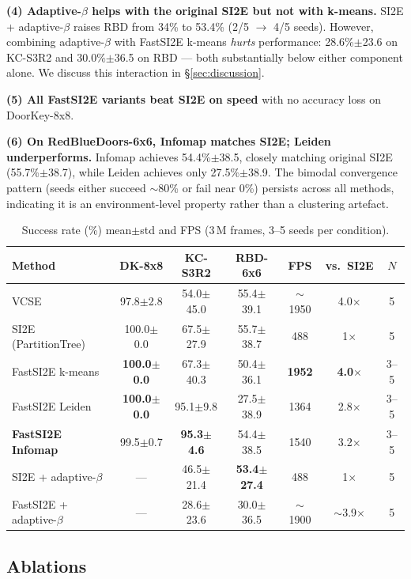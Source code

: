\documentclass[10pt,twocolumn]{article}
\newcommand{\fastsi}{FastSI2E}
\newcommand{\si}{SI2E}
\begin{document}
\textbf{(4) Adaptive-$\beta$ helps with the original \si{} but not with k-means.}
\si{} + adaptive-$\beta$ raises RBD from 34\% to 53.4\% (2/5 $\to$ 4/5 seeds).
However, combining adaptive-$\beta$ with \fastsi{} k-means \emph{hurts} performance:
28.6\%$\pm$23.6 on KC-S3R2 and 30.0\%$\pm$36.5 on RBD --- both substantially
below either component alone. We discuss this interaction in \S\ref{sec:discussion}.

\textbf{(5) All FastSI2E variants beat SI2E on speed} with no accuracy loss on
DoorKey-8x8.

\textbf{(6) On RedBlueDoors-6x6, Infomap matches SI2E; Leiden underperforms.}
Infomap achieves 54.4\%$\pm$38.5, closely matching original SI2E (55.7\%$\pm$38.7),
while Leiden achieves only 27.5\%$\pm$38.9. The bimodal convergence pattern (seeds
either succeed $\sim$80\% or fail near 0\%) persists across all methods, indicating
it is an environment-level property rather than a clustering artefact.

\begin{table}[t]
\centering
\caption{Success rate (\%) mean$\pm$std and FPS (3\,M frames, 3--5 seeds per condition).}
\label{tab:main}
\small
\begin{tabular}{lcccccc}
\toprule
Method & DK-8x8 & KC-S3R2 & RBD-6x6 & FPS & vs.\ \si{} & $N$ \\
\midrule
VCSE & 97.8$\pm$2.8 & 54.0$\pm$45.0 & 55.4$\pm$39.1 & $\sim$1950 & 4.0$\times$ & 5 \\
\si{} (PartitionTree) & 100.0$\pm$0.0 & 67.5$\pm$27.9 & 55.7$\pm$38.7 & 488 & 1$\times$ & 5 \\
\midrule
\fastsi{} k-means & \textbf{100.0$\pm$0.0} & 67.3$\pm$40.3 & 50.4$\pm$36.1 & \textbf{1952} & \textbf{4.0$\times$} & 3--5 \\
\fastsi{} Leiden & \textbf{100.0$\pm$0.0} & 95.1$\pm$9.8 & 27.5$\pm$38.9 & 1364 & 2.8$\times$ & 3--5 \\
\textbf{\fastsi{} Infomap} & 99.5$\pm$0.7 & \textbf{95.3$\pm$4.6} & 54.4$\pm$38.5 & 1540 & 3.2$\times$ & 3--5 \\
\midrule
\si{} + adaptive-$\beta$ & --- & 46.5$\pm$21.4 & \textbf{53.4$\pm$27.4} & 488 & 1$\times$ & 5 \\
\fastsi{} + adaptive-$\beta$ & --- & 28.6$\pm$23.6 & 30.0$\pm$36.5 & $\sim$1900 & $\sim$3.9$\times$ & 5 \\
\bottomrule
\end{tabular}
\end{table}

\subsection{Ablations}
\end{document}
